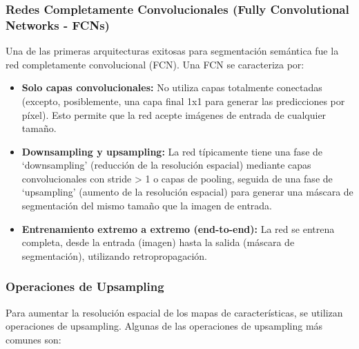 \documentclass{article}
\begin{document}
\subsubsection{Redes Completamente Convolucionales (Fully Convolutional Networks - FCNs)}

Una de las primeras arquitecturas exitosas para segmentación semántica fue la red completamente convolucional (FCN).  Una FCN se caracteriza por:

\begin{itemize}
    \item \textbf{Solo capas convolucionales:}  No utiliza capas totalmente conectadas (excepto, posiblemente, una capa final 1x1 para generar las predicciones por píxel). Esto permite que la red acepte imágenes de entrada de cualquier tamaño.
    \item \textbf{Downsampling y upsampling:}  La red típicamente tiene una fase de `downsampling' (reducción de la resolución espacial) mediante capas convolucionales con stride > 1 o capas de pooling, seguida de una fase de `upsampling' (aumento de la resolución espacial) para generar una máscara de segmentación del mismo tamaño que la imagen de entrada.
    \item \textbf{Entrenamiento extremo a extremo (end-to-end):}  La red se entrena completa, desde la entrada (imagen) hasta la salida (máscara de segmentación), utilizando retropropagación.
\end{itemize}

\subsubsection{Operaciones de Upsampling}

Para aumentar la resolución espacial de los mapas de características, se utilizan operaciones de upsampling.  Algunas de las operaciones de upsampling más comunes son:
\end{document}
